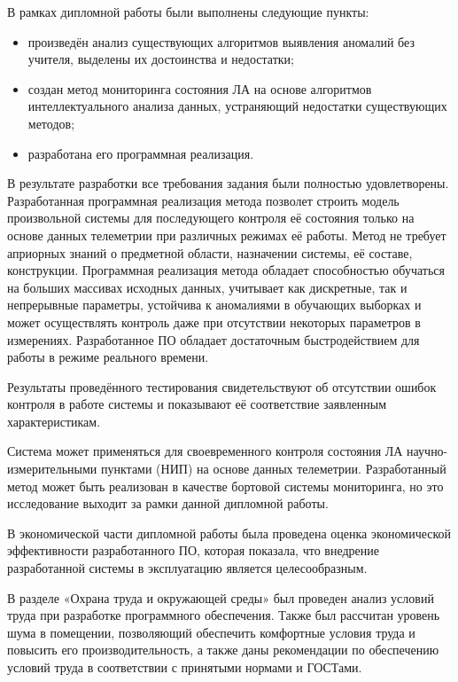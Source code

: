 В рамках дипломной работы были выполнены следующие пункты:
\begin{itemize} 
	\item произведён анализ существующих алгоритмов выявления аномалий без учителя, выделены их достоинства и недостатки;
	\item создан метод мониторинга состояния ЛА на основе алгоритмов интеллектуального анализа данных, устраняющий недостатки существующих методов;
	\item разработана его программная реализация.
\end{itemize}

В результате разработки все требования задания были полностью удовлетворены. Разработанная программная реализация метода позволет строить модель произвольной системы для последующего контроля её состояния только на основе данных телеметрии при различных режимах её работы. Метод не требует априорных знаний о предметной области, назначении системы, её составе, конструкции. Программная реализация метода обладает способностью обучаться на больших массивах исходных данных, учитывает как дискретные, так и непрерывные параметры, устойчива к аномалиями в обучающих выборках и может осуществлять контроль даже при отсутствии некоторых параметров в измерениях. Разработанное ПО обладает достаточным быстродействием для работы в режиме реального времени.

Результаты проведённого тестирования свидетельствуют об отсутствии ошибок контроля в работе системы и показывают её соответствие заявленным характеристикам.

Система может применяться для своевременного контроля состояния ЛА научно-измерительными пунктами (НИП) на основе данных телеметрии. Разработанный метод может быть реализован в качестве бортовой системы мониторинга, но это исследование выходит за рамки данной дипломной работы.

В экономической части дипломной работы была проведена оценка экономической эффективности разработанного ПО, которая показала, что внедрение разработанной системы в эксплуатацию является целесообразным.

В разделе «Охрана труда и окружающей среды» был проведен анализ условий труда при разработке программного обеспечения. Также был рассчитан уровень шума в помещении, позволяющий обеспечить комфортные условия труда и повысить его производительность, а также даны рекомендации по обеспечению условий труда в соответствии с принятыми нормами и ГОСТами.